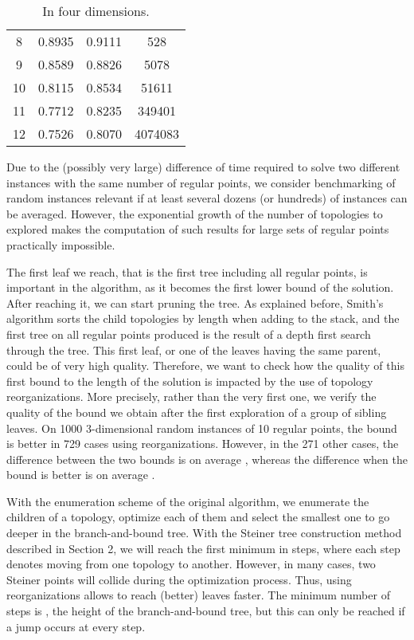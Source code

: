 \documentclass{article}
\theoremstyle{plain}
\begin{document}
\begin{table}
\begin{footnotesize}
\begin{subtable}[t]{\textwidth}
\begin{tabular}{c|c|c|c}
		8 & 0.8935 & 0.9111 & 528\\

		9 & 0.8589 & 0.8826 & 5078\\

		10 & 0.8115 & 0.8534 & 51611\\

		11 & 0.7712 & 0.8235 & 349401\\

		12 & 0.7526 & 0.8070 & 4074083\\
		\end{tabular}
		\caption{In four dimensions.}\label{tab:4d}
	\end{subtable}
	
\end{footnotesize}
\end{table}

Due to the (possibly very large) difference of time required to solve two different instances with the same number of regular points, we consider benchmarking of random instances relevant if at least several dozens (or hundreds) of instances can be averaged. 
However, the exponential growth of the number of topologies to explored makes the computation of such results for large sets of regular points practically impossible.

The first leaf we reach, that is the first tree including all  regular points, is important in the algorithm, as it becomes the first lower bound of the solution. 
After reaching it, we can start pruning the tree. 
As explained before, Smith's algorithm sorts the child topologies by length when adding to the stack, and the first tree on all regular points produced is the result of a depth first search through the tree. 
This first leaf, or one of the leaves having the same parent, could be of very high quality. 
Therefore, we want to check how the quality of this first bound to the length of the solution is impacted by the use of topology reorganizations. 
More precisely, rather than the very first one, we verify the quality of the bound we obtain after the first exploration of a group of sibling leaves.
On 1000 3-dimensional random instances of 10 regular points, the bound is better in 729 cases using reorganizations. 
However, in the 271 other cases, the difference between the two bounds is on average , whereas the difference when the bound is better is on average . 

With the enumeration scheme of the original algorithm, we enumerate the children of a topology, optimize each of them and select the smallest one to go deeper in the \mbox{branch-and-bound} tree. 
With the Steiner tree construction method described in Section 2, we will reach the first minimum in  steps, where each step denotes moving from one topology to another. 
However, in many cases, two Steiner points will collide during the optimization process. 
Thus, using reorganizations allows to reach (better) leaves faster. 
The minimum number  of steps is , the height of the \mbox{branch-and-bound} tree, but this can only be reached if a jump occurs at every step.
\end{document}
